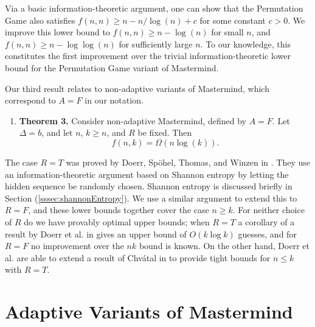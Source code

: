 \documentclass[12pt, a4paper]{article}
\begin{document}
Via a basic information-theoretic argument, one can show that the Permutation Game also satisfies $f(n, n)\ge n - n/\log(n) + c$ for some constant $c>0$. We improve this lower bound to $f(n, n)\ge n - \log(n)$ for small $n$, and $f(n, n)\ge n- \log \log(n)$ for sufficiently large $n$. To our knowledge, this constitutes the first improvement over the trivial information-theoretic lower bound for the Permutation Game variant of Mastermind.

Our third result relates to non-adaptive variants of Mastermind, which correspond to $A=F$ in our notation.
\begin{enumerate}[label=]
	\item\textbf{Theorem 3.} Consider non-adaptive Mastermind, defined by $A=F$. Let $\Delta = b$, and let $n$, $k \ge n$, and $R$ be fixed. Then
	\begin{equation*}
		f(n, k) = \Omega\left( n\log(k)\right).
	\end{equation*}
\end{enumerate}
The case $R = T$ was proved by Doerr, Sp\"ohel, Thomas, and Winzen in \cite{DS13}. They use an information-theoretic argument based on Shannon entropy by letting the hidden sequence be randomly chosen. Shannon entropy is discussed briefly in Section (\ref{sssec:shannonEntropy}).
We use a similar argument to extend this to $R = F$, and
these lower bounds together cover the case $n \geq k$. For neither choice of $R$ do we have provably optimal upper bounds; when $R = T$ a corollary of a result by Doerr et al. in \cite{DS13} gives an upper bound of $O(k \log k)$ guesses, and for $R = F$ no improvement over the $nk$ bound is known. On the other hand, Doerr et al. are able to extend a result of Chv\'atal in \cite{VC83} to provide tight bounds for $n \le k$ with $R = T$.

\section{Adaptive Variants of Mastermind}
\end{document}
